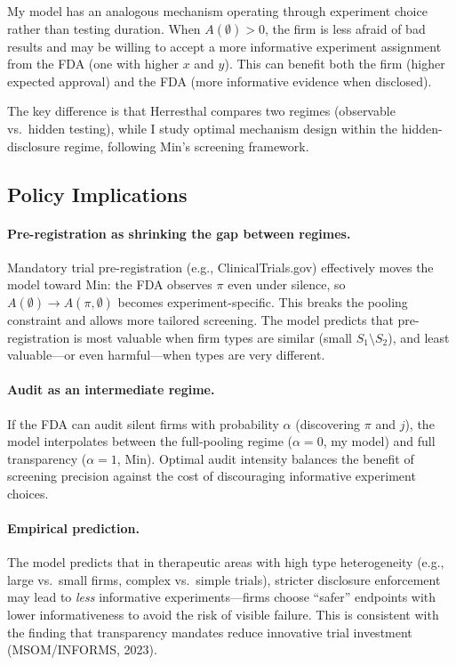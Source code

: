 \documentclass[12pt,a4paper]{article}
\begin{document}
My model has an analogous mechanism operating through
experiment choice rather than testing duration. When
$A(\emptyset) > 0$, the firm is less afraid of bad results
and may be willing to accept a more informative experiment
assignment from the FDA (one with higher $x$ and $y$). This
can benefit both the firm (higher expected approval) and the
FDA (more informative evidence when disclosed).

The key difference is that Herresthal compares two regimes
(observable vs.\ hidden testing), while I study optimal
mechanism design within the hidden-disclosure regime,
following Min's screening framework.

\subsection{Policy Implications}

\paragraph{Pre-registration as shrinking the gap between
  regimes.}
Mandatory trial pre-registration (e.g., ClinicalTrials.gov)
effectively moves the model toward Min: the FDA observes
$\pi$ even under silence, so
$A(\emptyset) \to A(\pi, \emptyset)$ becomes
experiment-specific. This breaks the pooling constraint and
allows more tailored screening. The model predicts that
pre-registration is most valuable when firm types are similar
(small $S_1 \setminus S_2$), and least valuable---or even
harmful---when types are very different.

\paragraph{Audit as an intermediate regime.}
If the FDA can audit silent firms with probability $\alpha$
(discovering $\pi$ and $j$), the model interpolates between
the full-pooling regime ($\alpha = 0$, my model) and full
transparency ($\alpha = 1$, Min). Optimal audit intensity
balances the benefit of screening precision against the cost
of discouraging informative experiment choices.

\paragraph{Empirical prediction.}
The model predicts that in therapeutic areas with high type
heterogeneity (e.g., large vs.\ small firms, complex vs.\
simple trials), stricter disclosure enforcement may lead to
\emph{less} informative experiments---firms choose ``safer''
endpoints with lower informativeness to avoid the risk of
visible failure. This is consistent with the finding that
transparency mandates reduce innovative trial investment
(MSOM/INFORMS, 2023).
\end{document}
